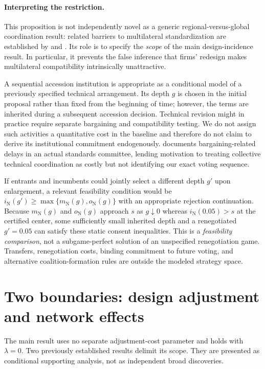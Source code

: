 \documentclass[11pt,a4paper]{article}
\theoremstyle{remark}\newtheorem{remark}[theorem]{Remark}
\newcommand{\N}{\mathrm{N}}\newcommand{\F}{\mathrm{F}}
\begin{document}
\paragraph{Interpreting the restriction.}
This proposition is not independently novel as a generic regional-versus-global coordination result: related barriers to multilateral standardization are established by \citet{Takarada2020} and \citet{Kawabata2021}. Its role is to specify the \emph{scope} of the main design-incidence result. In particular, it prevents the false inference that firms' redesign makes multilateral compatibility intrinsically unattractive.

A sequential accession institution is appropriate as a conditional model of a previously specified technical arrangement. Its depth $g$ is chosen in the initial proposal rather than fixed from the beginning of time; however, the terms are inherited during a subsequent accession decision. Technical revision might in practice require separate bargaining and compatibility testing. We do not assign such activities a quantitative cost in the baseline and therefore do not claim to derive its institutional commitment endogenously. \citet{Simcoe2012} documents bargaining-related delays in an actual standards committee, lending motivation to treating collective technical coordination as costly but not identifying our exact voting sequence.

If entrants and incumbents could jointly select a different depth $g'$ upon enlargement, a relevant feasibility condition would be $i_{\N}(g')\ge\max\{m_{\N}(g),o_{\N}(g)\}$ with an appropriate rejection continuation. Because $m_{\N}(g)$ and $o_{\N}(g)$ approach $s$ as $g\downarrow0$ whereas $i_{\N}(0.05)>s$ at the certified center, some sufficiently small inherited depth and a renegotiated $g'=0.05$ can satisfy these static consent inequalities. This is a \emph{feasibility comparison}, not a subgame-perfect solution of an unspecified renegotiation game. Transfers, renegotiation costs, binding commitment to future voting, and alternative coalition-formation rules are outside the modeled strategy space.

\section{Two boundaries: design adjustment and network effects}\label{sec:boundaries}
The main result uses no separate adjustment-cost parameter and holds with $\lambda=0$. Two previously established results delimit its scope. They are presented as conditional supporting analysis, not as independent broad discoveries.
\end{document}
